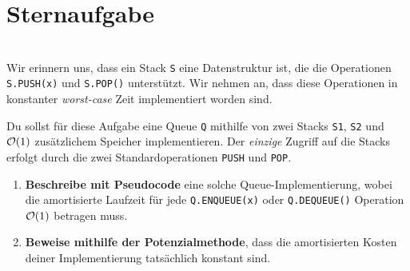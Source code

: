\documentclass{uebung_cs}
\begin{document}
\section*{Sternaufgabe}

\begin{aufgabe}\mbox{}\\
	Wir erinnern uns, dass ein Stack \texttt{S} eine Datenstruktur ist, die die Operationen \texttt{S.PUSH(x)} und \texttt{S.POP()} unterstützt. Wir nehmen an, dass diese Operationen in konstanter \emph{worst-case} Zeit implementiert worden sind.

	Du sollst für diese Aufgabe eine Queue \texttt{Q} mithilfe von zwei Stacks \texttt{S1}, \texttt{S2} und $\mathcal{O}(1)$ zusätzlichem Speicher implementieren. 
	Der \textit{einzige} Zugriff auf die Stacks erfolgt durch die zwei Standardoperationen \texttt{PUSH} und \texttt{POP}.
	\begin{enumerate}
		\item 
		\textbf{Beschreibe mit Pseudocode} eine solche Queue-Implementierung, wobei die amortisierte Laufzeit für jede \texttt{Q.ENQUEUE(x)} oder \texttt{Q.DEQUEUE()} Operation $\mathcal{O}(1)$ betragen muss.
		\item
		\textbf{Beweise mithilfe der Potenzialmethode}, dass die amortisierten Kosten deiner Implementierung tatsächlich konstant sind.
	\end{enumerate}
\end{aufgabe}
\end{document}
